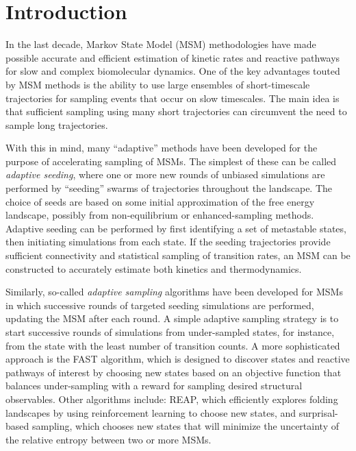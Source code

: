 \documentclass[%
 aip,
rsi,%
 amsmath,amssymb,
 reprint,%
]{revtex4-1}
\begin{document}

\section*{Introduction}
In the last decade, Markov State Model (MSM) methodologies have made possible accurate and efficient estimation of kinetic rates and reactive pathways for slow and complex biomolecular dynamics.\cite{Noe:2009en,Voelz:2010hs,Prinz:2011id,Chodera:2014gk,noe2014introduction} One of the key advantages touted by MSM methods is the ability to use large ensembles of short-timescale trajectories for sampling events that occur on slow timescales.  The main idea is that sufficient sampling using many short trajectories can circumvent the need to sample long trajectories.

With this in mind, many ``adaptive'' methods have been developed for the purpose of accelerating sampling of MSMs.  The simplest of these can be called \textit{adaptive seeding}, where one or more new rounds of unbiased simulations are performed by ``seeding'' swarms of trajectories throughout the landscape.\cite{Huang:2009bx} The choice of seeds are based on some initial approximation of the free energy landscape, possibly from non-equilibrium or enhanced-sampling methods.  Adaptive seeding can be performed by first identifying a set of metastable states, then initiating simulations from each state.  If the seeding trajectories provide sufficient connectivity and statistical sampling of transition rates, an MSM can be constructed to accurately estimate both kinetics and thermodynamics.  
 
Similarly, so-called \textit{adaptive sampling} algorithms have been developed for MSMs in which successive rounds of targeted seeding simulations are performed, updating the MSM after each round.\cite{Voelz:2014kk,Shamsi:2017jg} A simple adaptive sampling strategy is to start successive rounds of simulations from under-sampled states, for instance, from the state with the least number of transition counts.\cite{Doerr:2014fc}  A more sophisticated approach is the FAST algorithm, which is designed to discover states and reactive pathways of interest by choosing new states based on an objective function that balances under-sampling with a reward for sampling desired structural observables.\cite{Zimmerman:2015kf,Zimmerman:2018jn} Other algorithms include: REAP, which efficiently explores folding landscapes by using reinforcement learning to choose new states,\cite{shamsi2017reinforcement} and surprisal-based sampling,\cite{Voelz:2014kk} which chooses new states that will minimize the uncertainty of the relative entropy between two or more MSMs.
\end{document}
